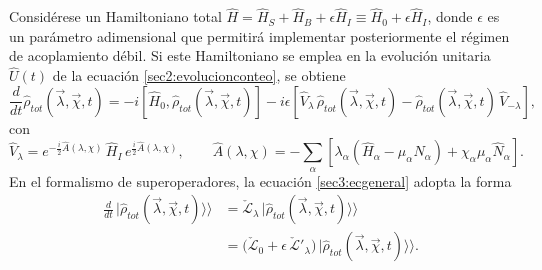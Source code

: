 Considérese un Hamiltoniano total 
\(\hat{H} = \hat{H}_{S} + \hat{H}_{B} + \epsilon \hat{H}_{I} \equiv \hat{H}_{0} + \epsilon \hat{H}_{I}\),
donde \(\epsilon\) es un parámetro adimensional que permitirá implementar posteriormente el régimen de acoplamiento débil. Si este Hamiltoniano se emplea en la evolución unitaria \(\hat{U}(t)\) de la ecuación \eqref{sec2:evolucionconteo}, se obtiene
\begin{equation}
    \frac{d}{dt}\hat{\rho}_{tot}(\vec{\lambda},\vec{\chi},t) 
    = -i[\hat{H}_{0},\hat{\rho}_{tot}(\vec{\lambda},\vec{\chi},t)]
      - i\epsilon\!\left[\hat{V}_{\lambda}\,\hat{\rho}_{tot}(\vec{\lambda},\vec{\chi},t)
      - \hat{\rho}_{tot}(\vec{\lambda},\vec{\chi},t)\,\hat{V}_{-\lambda}\right],
    \label{sec3:ecgeneral}
\end{equation}
con
\begin{equation*}
    \hat{V}_{\lambda} 
    = e^{-\frac{i}{2}\hat{A}(\lambda,\chi)}\,\hat{H}_{I}\,e^{\frac{i}{2}\hat{A}(\lambda,\chi)},
    \qquad 
    \hat{A}(\lambda,\chi) 
    = -\sum_{\alpha}\!\left[\lambda_{\alpha}(\hat{H}_{\alpha}-\mu_{\alpha}\hat{N}_{\alpha})
      + \chi_{\alpha}\mu_{\alpha}\hat{N}_{\alpha}\right].
\end{equation*}
En el formalismo de superoperadores, la ecuación \eqref{sec3:ecgeneral} adopta la forma
\begin{align*}
    \frac{d}{dt}\,|\hat{\rho}_{tot}(\vec{\lambda},\vec{\chi},t)\rangle\rangle
    &= \check{\mathcal{L}}_{\lambda}\,|\hat{\rho}_{tot}(\vec{\lambda},\vec{\chi},t)\rangle\rangle \\
    &= \big(\check{\mathcal{L}}_{0} + \epsilon\,\check{\mathcal{L}}'_{\lambda}\big)\,
       |\hat{\rho}_{tot}(\vec{\lambda},\vec{\chi},t)\rangle\rangle .
\end{align*}

